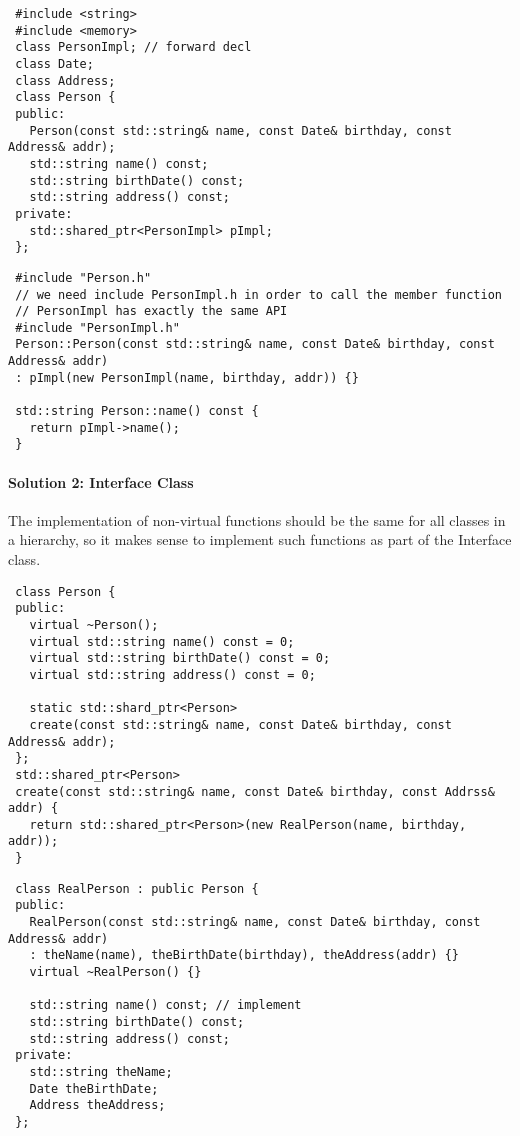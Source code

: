 \begin{lstlisting}
 #include <string>
 #include <memory>
 class PersonImpl; // forward decl
 class Date;
 class Address;
 class Person {
 public:
   Person(const std::string& name, const Date& birthday, const Address& addr);
   std::string name() const;
   std::string birthDate() const;
   std::string address() const;
 private:
   std::shared_ptr<PersonImpl> pImpl;
 };
\end{lstlisting}
\begin{lstlisting}
 #include "Person.h"
 // we need include PersonImpl.h in order to call the member function
 // PersonImpl has exactly the same API
 #include "PersonImpl.h"
 Person::Person(const std::string& name, const Date& birthday, const Address& addr)
 : pImpl(new PersonImpl(name, birthday, addr)) {}

 std::string Person::name() const {
   return pImpl->name();
 }
\end{lstlisting}

\paragraph{Solution 2: Interface Class}
The implementation of non-virtual functions should be the same for all
classes in a hierarchy, so it makes sense to implement such functions
as part of the Interface class.
\begin{lstlisting}
 class Person {
 public:
   virtual ~Person();
   virtual std::string name() const = 0;
   virtual std::string birthDate() const = 0;
   virtual std::string address() const = 0;

   static std::shard_ptr<Person>
   create(const std::string& name, const Date& birthday, const Address& addr);
 };
 std::shared_ptr<Person>
 create(const std::string& name, const Date& birthday, const Addrss& addr) {
   return std::shared_ptr<Person>(new RealPerson(name, birthday, addr));
 }
\end{lstlisting}

\begin{lstlisting}
 class RealPerson : public Person {
 public:
   RealPerson(const std::string& name, const Date& birthday, const Address& addr)
   : theName(name), theBirthDate(birthday), theAddress(addr) {}
   virtual ~RealPerson() {}

   std::string name() const; // implement
   std::string birthDate() const;
   std::string address() const;
 private:
   std::string theName;
   Date theBirthDate;
   Address theAddress;
 };
\end{lstlisting}

